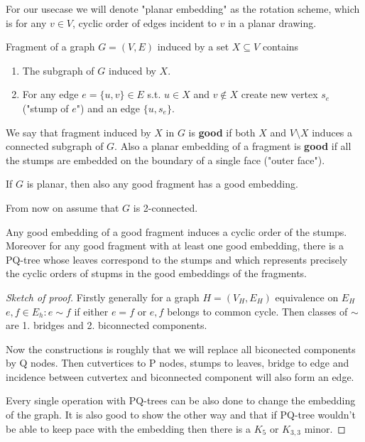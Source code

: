 For our usecase we will denote "planar embedding" as the rotation scheme, which is for any $v \in V$, cyclic order of edges incident to $v$ in a planar drawing.

\begin{defn}
	Fragment of a graph $G = (V,E)$ induced by a set $X \subseteq V$ contains

	\begin{enumerate}
			\item The subgraph of $G$ induced by $X$.
			\item For any edge $e = \{u,v\} \in E$ s.t. $u \in X$ and $v \notin X$ create new vertex $s_{e}$ ("stump of $e$") and an edge $\{u, s_{e}\}$.
	\end{enumerate}
\end{defn}

We say that fragment induced by $X$ in $G$ is \textbf{good} if both $X$ and $V \setminus X$ induces a connected subgraph of $G$. Also a planar embedding of a fragment is \textbf{good} if all the stumps are embedded on the boundary of a single face ("outer face").

\begin{observ}
	If $G$ is planar, then also any good fragment has a good embedding.
\end{observ}

From now on assume that $G$ is 2-connected.

\begin{fact}
	Any good embedding of a good fragment induces a cyclic order of the stumps. Moreover for any good fragment with at least one good embedding, there is a PQ-tree whose leaves correspond to the stumps and which represents precisely the cyclic orders of stupms in the good embeddings of the fragments.
\end{fact}

\begin{proof}[Sketch of proof]
	Firstly generally for a graph $H = (V_{H}, E_{H})$ equivalence on $E_{H}$ $e,f \in E_{h}: e \sim f$ if either $e = f$ or $e, f$ belongs to common cycle. Then classes of $\sim$ are 1. bridges and 2. biconnected components.

	Now the constructions is roughly that we will replace all biconected components by Q nodes. Then cutvertices to P nodes, stumps to leaves, bridge to edge and incidence between cutvertex and biconnected component will also form an edge.

	Every single operation with PQ-trees can be also done to change the embedding of the graph. It is also good to show the other way and that if PQ-tree wouldn't be able to keep pace with the embedding then there is a $K_{5}$ or $K_{3,3}$ minor.
\end{proof}


